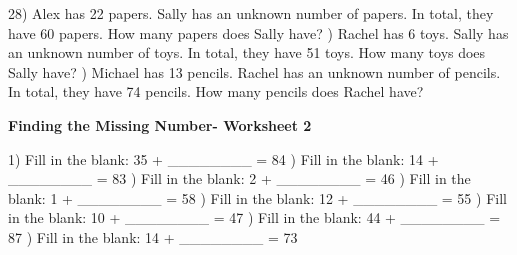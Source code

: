 \documentclass{article}%
\begin{document}
28) Alex has 22 papers. Sally has an unknown number of papers. In total, they have 60 papers. How many papers does Sally have?%
\newline%
\newline%
) Rachel has 6 toys. Sally has an unknown number of toys. In total, they have 51 toys. How many toys does Sally have?%
\newline%
\newline%
) Michael has 13 pencils. Rachel has an unknown number of pencils. In total, they have 74 pencils. How many pencils does Rachel have?%
\newline%
\newline%
\newline%
\pagebreak%
\large%
\begin{center}%
\textbf{Finding the Missing Number- Worksheet 2}%
\newline%
\newline%
\newline%
\end{center} \normalsize%
1) Fill in the blank: 35 + \_\_\_\_\_\_\_\_ = 84%
\newline%
\newline%
) Fill in the blank: 14 + \_\_\_\_\_\_\_\_ = 83%
\newline%
\newline%
) Fill in the blank: 2 + \_\_\_\_\_\_\_\_ = 46%
\newline%
\newline%
) Fill in the blank: 1 + \_\_\_\_\_\_\_\_ = 58%
\newline%
\newline%
) Fill in the blank: 12 + \_\_\_\_\_\_\_\_ = 55%
\newline%
\newline%
) Fill in the blank: 10 + \_\_\_\_\_\_\_\_ = 47%
\newline%
\newline%
) Fill in the blank: 44 + \_\_\_\_\_\_\_\_ = 87%
\newline%
\newline%
) Fill in the blank: 14 + \_\_\_\_\_\_\_\_ = 73%
\end{document}

